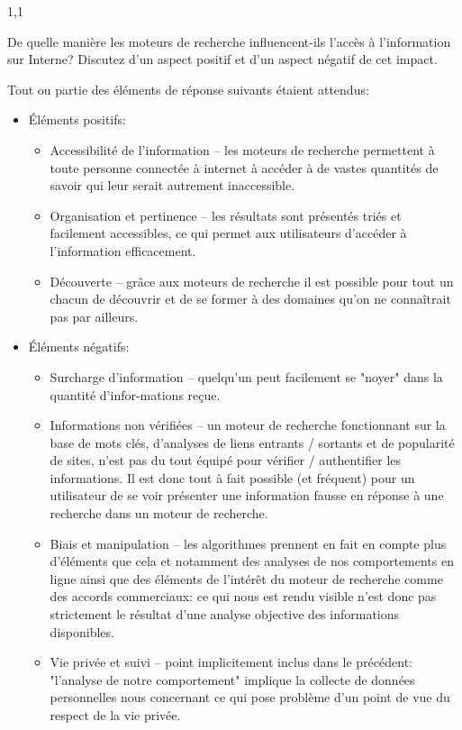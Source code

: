 \documentclass[11pt,a4paper]{exam}
\begin{document}
\begin{spacing}{1,1}
\begin{questions}
        	\question[2] De quelle manière les moteurs de recherche influencent-ils l'accès à l'information sur Interne? Discutez d'un aspect positif et d'un aspect négatif de cet impact.
        	\begin{solution}
        		Tout ou partie des éléments de réponse suivants étaient attendus:
        		\begin{itemize}
        			\item Éléments positifs:
        			\begin{itemize}
        				\item Accessibilité de l'information -- les moteurs de recherche permettent à toute personne connectée à internet à accéder à de vastes quantités de savoir qui leur serait autrement inaccessible.
        				\item Organisation et pertinence -- les résultats sont présentés triés et facilement accessibles, ce qui permet aux utilisateurs d'accéder à l'information efficacement.
        				\item Découverte -- grâce aux moteurs de recherche il est possible pour tout un chacun de découvrir et de se former à des domaines qu'on ne connaîtrait pas par ailleurs.
        			\end{itemize}
        			\item Éléments négatifs:
        			\begin{itemize}
        				\item Surcharge d'information -- quelqu'un peut facilement se "noyer" dans la quantité d'infor-mations reçue.
        				\item Informations non vérifiées -- un moteur de recherche fonctionnant sur la base de mots clés, d'analyses de liens entrants / sortants et de popularité de sites, n'est pas du tout équipé pour vérifier / authentifier les informations. Il est donc tout à fait possible (et fréquent) pour un utilisateur de se voir présenter une information fausse en réponse à une recherche dans un moteur de recherche.
        				\item Biais et manipulation -- les algorithmes prennent en fait en compte plus d'éléments que cela et notamment des analyses de nos comportements en ligne ainsi que des éléments de l'intérêt du moteur de recherche comme des accords commerciaux: ce qui nous est rendu visible n'est donc pas strictement le résultat d'une analyse objective des informations disponibles.
        				\item Vie privée et suivi -- point implicitement inclus dans le précédent: "l'analyse de notre comportement" implique la collecte de données personnelles nous concernant ce qui pose problème d'un point de vue du respect de la vie privée.
        			\end{itemize}
        		\end{itemize}
        	\end{solution}
        	

\end{questions}
\end{spacing}
\end{document}
